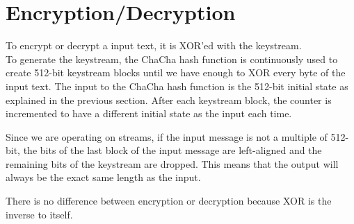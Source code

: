\section{Encryption/Decryption}
\label{sec:chacha.encryption}

To encrypt or decrypt a input text, it is XOR'ed with the keystream. \\
To generate the keystream, the ChaCha hash function is continuously used to create 512-bit keystream blocks until we have enough to XOR every byte of the input text. The input to the ChaCha hash function is the 512-bit initial state as explained in the previous section. After each keystream block, the counter is incremented to have a different initial state as the input each time.

Since we are operating on streams, if the input message is not a multiple of 512-bit, the bits of the last block of the input message are left-aligned and the remaining bits of the keystream are dropped. This means that the output will always be the exact same length as the input.

There is no difference between encryption or decryption because XOR is the inverse to itself.
